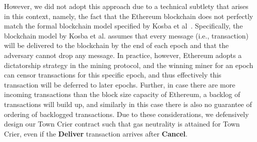 However, we did not adopt this approach due to a technical subtlety
that arises in this context, namely, the fact that  
the Ethereum blockchain does not  
perfectly match the formal blockchain 
model specified by Kosba et al~\cite{hawk}.
Specifically, the blockchain model by Kosba et al.
assumes that every message (i.e., transaction) will be delivered 
to the blockchain 
by the end of each epoch and that the adversary cannot drop
any message.
In practice, however, 
Ethereum adopts a dictatorship 
strategy in the mining protocol, and the winning miner 
for an epoch can censor transactions for this specific epoch, and thus
effectively this transaction will be deferred to later epochs.
Further, in case there are more incoming transactions than the block size
capacity of Ethereum, a backlog of transactions will build up, 
and similarly in this case there is also no guarantee of 
ordering of backlogged transactions.
Due to these considerations, we defensively design our Town Crier contract
such that gas neutrality is attained for Town Crier,
even if the {\bf Deliver} transaction arrives after {\bf Cancel}.





